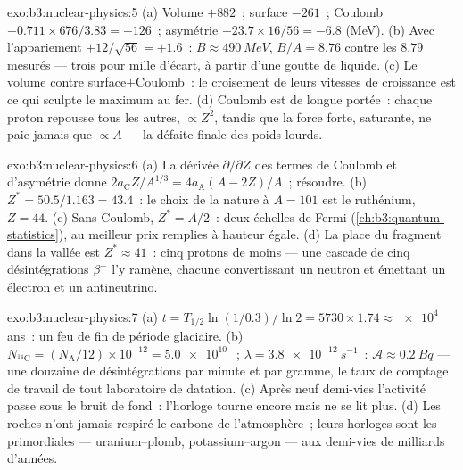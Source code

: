 \begin{solution}{exo:b3:nuclear-physics:5}
(a) Volume $+882$~; surface $-261$~; Coulomb $-0.711\times676/3.83
= -126$~; asymétrie $-23.7\times16/56 = -6.8$ (\unit{MeV}). (b)
Avec l'appariement $+12/\sqrt{56} = +1.6$~: $B \approx \qty{490}{MeV}$,
$B/A = 8.76$ contre les $8.79$ mesurés --- trois pour mille d'écart,
à partir d'une goutte de liquide. (c) Le volume contre
surface$+$Coulomb~: le croisement de leurs vitesses de croissance est
ce qui sculpte le maximum au fer. (d) Coulomb est de longue portée~:
chaque proton repousse tous les autres, $\propto Z^2$, tandis que la
force forte, saturante, ne paie jamais que $\propto A$ --- la défaite
finale des poids lourds.
\end{solution}

\begin{solution}{exo:b3:nuclear-physics:6}
(a) La dérivée $\partial/\partial Z$ des termes de Coulomb et
d'asymétrie donne
$2a_{\text{C}}Z/A^{1/3} = 4a_{\text{A}}(A - 2Z)/A$~; résoudre.
(b) $Z^* = 50.5/1.163 = 43.4$~: le choix de la nature à $A = 101$ est
le ruthénium, $Z = 44$. (c) Sans Coulomb, $Z^* = A/2$~: deux échelles
de Fermi (\cref{ch:b3:quantum-statistics}), au meilleur prix
remplies à hauteur égale. (d) La place du fragment dans la vallée est
$Z^* \approx 41$~: cinq protons de moins --- une cascade de cinq
désintégrations $\beta^-$ l'y ramène, chacune convertissant un
neutron et émettant un électron et un antineutrino.
\end{solution}

\begin{solution}{exo:b3:nuclear-physics:7}
(a) $t = T_{1/2}\ln(1/0.3)/\ln2 = 5730\times1.74 \approx
\qty{e4}{}$ ans~: un feu de fin de période glaciaire. (b) $N_{^{14}\text{C}}
= (N_{\text{A}}/12)\times10^{-12} = \qty{5.0e10}{}$~; $\lambda =
\qty{3.8e-12}{s^{-1}}$~: $\mathcal A \approx \qty{0.2}{Bq}$ ---
une douzaine de désintégrations par minute et par gramme, le taux de
comptage de travail de tout laboratoire de datation. (c) Après neuf
demi-vies l'activité passe sous le bruit de fond~: l'horloge tourne
encore mais ne se lit plus. (d) Les roches n'ont jamais respiré le
carbone de l'atmosphère~; leurs horloges sont les primordiales ---
uranium--plomb, potassium--argon --- aux demi-vies de milliards
d'années.
\end{solution}

